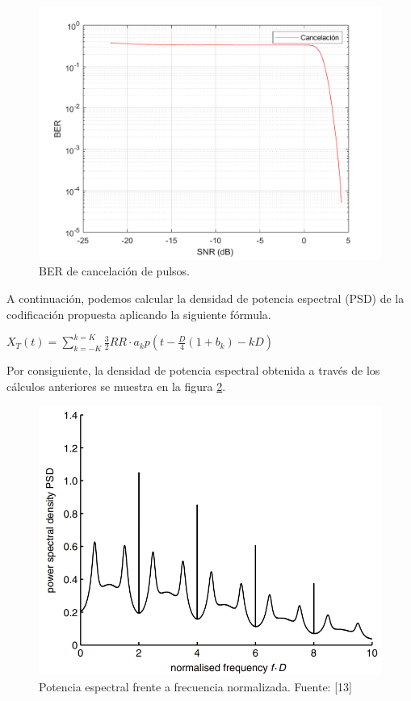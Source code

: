 \begin{figure}[ht]
    \centering
    \includegraphics[scale=0.45]{./figuras/solo_soft_cancelacion.pdf}
    \caption{\small{BER de cancelación de pulsos.}}
    \label{solo_soft_cancelacion}%
\end{figure}

A continuación, podemos calcular la densidad de potencia espectral (PSD) de la 
codificación propuesta aplicando la siguiente fórmula. \cite{anto_cancel}

\vspace{0.5cm}
$ X_T(t) = \sum_{k=-K}^{k=K}\frac{3}{2}RR \cdot a_kp (t-\frac{D}{4}(1+b_k)-kD)$
\vspace{0.5cm}

Por consiguiente, la densidad de potencia espectral obtenida a través de los cálculos
anteriores se muestra en la figura \ref{psd_cancelación}.
\newpage
\begin{figure}[ht]
    \centering
    \includegraphics[scale=0.5]{./figuras/psd_cancelacion.png}
    \caption{\small{Potencia espectral frente a frecuencia normalizada. Fuente: [13]}}
    \label{psd_cancelación}%
\end{figure}


